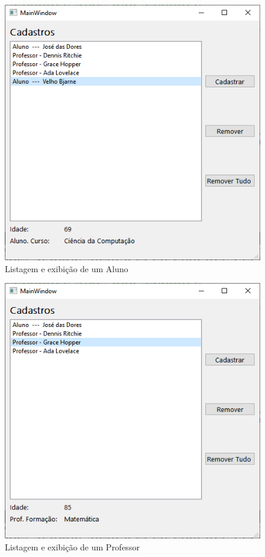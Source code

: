\documentclass[12pt,a4paper]{article}
\begin{document}
\begin{figure}[h]
    \centering
    \includegraphics[width=\textwidth]{teste_aluno}
    \caption{Listagem e exibição de um Aluno}
    \label{teste_aluno}
\end{figure}
\begin{figure}[h]
    \centering
    \includegraphics[width=\textwidth]{teste_prof}
    \caption{Listagem e exibição de um Professor}
    \label{teste_prof}
\end{figure}
\end{document}
